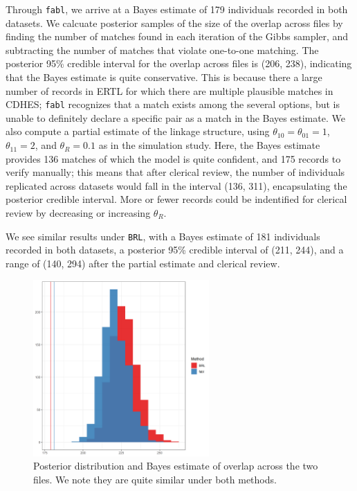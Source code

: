 \documentclass[12pt,letterpaper]{article}
\newcommand{\1}[1]{\mathbb{I}\!\left[#1\right]} %
\begin{document}
Through \texttt{fabl}, we arrive at a Bayes estimate of 179 individuals recorded in both datasets. We calcuate posterior samples of the size of the overlap across files by finding the number of matches found in each iteration of the Gibbs sampler, and subtracting the number of matches that violate one-to-one matching. The posterior 95\% credible interval for the overlap across files is (206, 238), indicating that the Bayes estimate is quite conservative. This is because there a large number of records in ERTL for which there are multiple plausible matches in CDHES; \texttt{fabl} recognizes that a match exists among the several options, but is unable to definitely declare a specific pair as a match in the Bayes estimate. We also compute a partial estimate of the linkage structure, using $\theta_{10} = \theta_{01} = 1$, $\theta_{11} = 2$, and $\theta_R = 0.1$ as in the simulation study. Here, the Bayes estimate provides 136 matches of which the model is quite confident, and 175 records to verify manually; this means that after clerical review, the number of individuals replicated across datasets would fall in the interval (136, 311), encapsulating the posterior credible interval. More or fewer records could be indentified for clerical review by decreasing or increasing $\theta_R$. 

We see similar results under \texttt{BRL}, with a Bayes estimate of 181 individuals recorded in both datasets, a posterior 95\% credible interval of (211, 244), and a range of (140, 294) after the partial estimate and clerical review. 

\begin{figure}[h!]
	\begin{center}
		\includegraphics[width=0.6\textwidth]{../notes/figures/el_salvador/overlap_distribution_smallP_bayes}
		\caption{Posterior distribution and Bayes estimate of overlap across the two files. We note they are quite similar under both methods.}
		\label{fig:overlap-plot}
	\end{center}
\end{figure}
\end{document}
